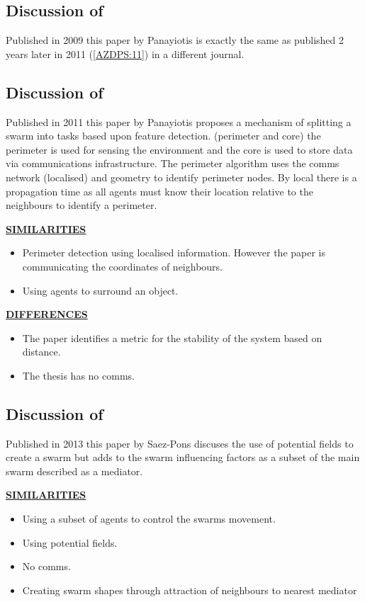 \documentclass[a4paper,11pt,nocenter,bold,notitlepage,noheadline,noindent]{
thesis}
\begin{document}
\subsection{Discussion of \cite{APZDAMC:09}}
Published in 2009 this paper by Panayiotis is exactly the same as \cite{AZDPS:11} published 2 years later in 2011 (\autoref{AZDPS:11}) in a different journal.

\subsection{Discussion of \cite{AZDPS:11}}\label{AZDPS:11}
Published in 2011 this paper by Panayiotis proposes a mechanism of splitting a swarm into tasks based upon feature detection. (perimeter and core) the perimeter is used for sensing the environment and the core is used to store data via communications infrastructure. The perimeter algorithm uses the comms network (localised) and geometry to identify perimeter nodes. By local there is a propagation time as all agents must know their location relative to the neighbours to identify a perimeter.  

\textbf{\underline{SIMILARITIES}}
\begin{itemize}
   \setlength\itemsep{0em}
	\item Perimeter detection using localised information. However the paper is communicating the coordinates of neighbours.
	\item Using agents to surround an object. 
\end{itemize} 

\textbf{\underline{DIFFERENCES}}
\begin{itemize}
   \setlength\itemsep{0em}
	\item The paper identifies a metric for the stability of the system based on distance. 
	\item The thesis has no comms.
\end{itemize} 

\subsection{Discussion of \cite{JG:13}}
Published in 2013 this paper by Saez-Pons discuses the use of potential fields to create a swarm but adds to the swarm influencing factors as a subset of the main swarm described as a mediator.  

\textbf{\underline{SIMILARITIES}}
\begin{itemize}
   \setlength\itemsep{0em}
	\item Using a subset of agents to control the swarms movement.
	\item Using potential fields.
	\item No comms.
	\item Creating swarm shapes through attraction of neighbours to nearest mediator
\end{itemize} 
\end{document}
